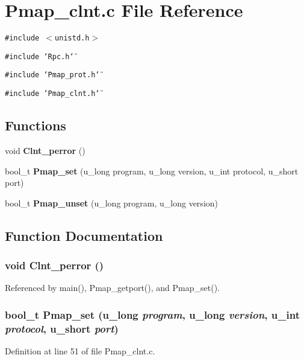 \section{Pmap\_\-clnt.c File Reference}
\label{Pmap__clnt_8c}
{\tt \#include $<$unistd.h$>$}\par
{\tt \#include \char`\"{}Rpc.h\char`\"{}}\par
{\tt \#include \char`\"{}Pmap\_\-prot.h\char`\"{}}\par
{\tt \#include \char`\"{}Pmap\_\-clnt.h\char`\"{}}\par
\subsection*{Functions}
\begin{CompactItemize}
\item 
void {\bf Clnt\_\-perror} ()
\item 
bool\_\-t {\bf Pmap\_\-set} (u\_\-long program, u\_\-long version, u\_\-int protocol, u\_\-short port)
\item 
bool\_\-t {\bf Pmap\_\-unset} (u\_\-long program, u\_\-long version)
\end{CompactItemize}


\subsection{Function Documentation}
\subsubsection{\setlength{\rightskip}{0pt plus 5cm}void Clnt\_\-perror ()}\label{Pmap__clnt_8c_a2}




Referenced by main(), Pmap\_\-getport(), and Pmap\_\-set().
\subsubsection{\setlength{\rightskip}{0pt plus 5cm}bool\_\-t Pmap\_\-set (u\_\-long {\em program}, u\_\-long {\em version}, u\_\-int {\em protocol}, u\_\-short {\em port})}\label{Pmap__clnt_8c_a3}




Definition at line 51 of file Pmap\_\-clnt.c.

